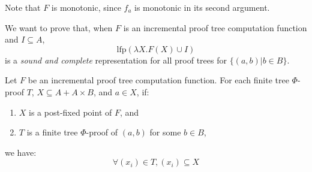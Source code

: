 \documentclass[12pt]{article}
\begin{document}
Note that $F$ is monotonic, since $f_a$ is monotonic in its second argument.

We want to prove that, when $F$ is an incremental proof tree computation function and $I\subseteq A$,
\[\text{lfp}(\lambda X.F(X)\cup I)\]
is a \emph{sound and complete} representation for all proof trees for $\{(a,b)|b\in B\}$.

\begin{theorem}[Soundness]
	Let $F$ be an incremental proof tree computation function.
	For each finite tree $\Phi$-proof $T$, $X\subseteq A+A\times B$, and $a\in X$, if:
	\begin{enumerate}
		\item $X$ is a post-fixed point of $F$, and
		\item $T$ is a finite tree $\Phi$-proof of $(a,b)$ for some $b\in B$,
	\end{enumerate}
	we have:
	\[\forall(x_i)\in T,(x_i)\subseteq X\]
\end{theorem}
\end{document}
